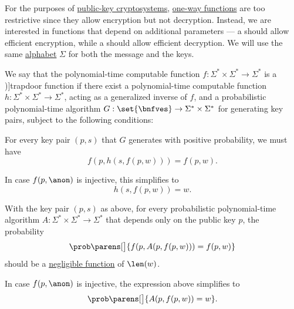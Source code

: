 \begin{definition}\label{def:trapdoor_function}\mimprovised
  For the purposes of \hyperref[con:cryptography]{public-key cryptosystems}, \hyperref[def:one_way_function]{one-way functions} are too restrictive since they allow encryption but not decryption. Instead, we are interested in functions that depend on additional parameters --- a  should allow efficient encryption, while a  should allow efficient decryption. We will use the same \hyperref[def:formal_language/alphabet]{alphabet} \( \Sigma \) for both the message and the keys.

  We say that the polynomial-time computable function \( f: \Sigma^* \times \Sigma^* \to \Sigma^* \) is a \term[en=trapdoor function (\cite[def. 10.47]{Sipser2013TheoryOfComputation})]{trapdoor function} if there exist a polynomial-time computable function \( h: \Sigma^* \times \Sigma^* \to \Sigma^* \), acting as a generalized inverse of \( f \), and a probabilistic polynomial-time algorithm \( G: \set{ \bnfves } \to \Sigma^* \times \Sigma^* \) for generating key pairs, subject to the following conditions:
  \begin{thmenum}
     For every key pair \( (p, s) \) that \( G \) generates with positive probability, we must have
    \begin{equation*}
      f(p, h(s, f(p, w))) = f(p, w).
    \end{equation*}

    In case \( f(p, \anon) \) is injective, this simplifies to
    \begin{equation*}
      h(s, f(p, w)) = w.
    \end{equation*}

     With the key pair \( (p, s) \) as above, for every probabilistic polynomial-time algorithm \( A: \Sigma^* \times \Sigma^* \to \Sigma^* \) that depends only on the public key \( p \), the probability
    \begin{equation*}
      \prob\parens[\big]{ f(p, A(p, f(p, w))) = f(p, w) }
    \end{equation*}
    should be a \hyperref[def:negligible_function]{negligible function} of \( \len(w) \).

    In case \( f(p, \anon) \) is injective, the expression above simplifies to
    \begin{equation*}
      \prob\parens[\big]{ A(p, f(p, w)) = w }.
    \end{equation*}
  \end{thmenum}
\end{definition}

